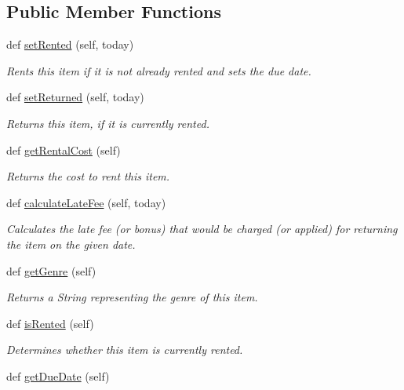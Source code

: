 \subsection*{Public Member Functions}
\begin{DoxyCompactItemize}
\item 
def \hyperlink{classItem_1_1Item_a866dd05fa3e3ab124f6afeaa171ab516}{set\+Rented} (self, today)
\begin{DoxyCompactList}\small\item\em Rents this item if it is not already rented and sets the due date. \end{DoxyCompactList}\item 
def \hyperlink{classItem_1_1Item_afc0dccd77c3d32664c5a424886d7d53c}{set\+Returned} (self, today)
\begin{DoxyCompactList}\small\item\em Returns this item, if it is currently rented. \end{DoxyCompactList}\item 
def \hyperlink{classItem_1_1Item_afe4448d1a099b956ecc0fc66ca22925d}{get\+Rental\+Cost} (self)
\begin{DoxyCompactList}\small\item\em Returns the cost to rent this item. \end{DoxyCompactList}\item 
def \hyperlink{classItem_1_1Item_a17d1bdd2d1f6d4ad81a9d1fd0b2d149d}{calculate\+Late\+Fee} (self, today)
\begin{DoxyCompactList}\small\item\em Calculates the late fee (or bonus) that would be charged (or applied) for returning the item on the given date. \end{DoxyCompactList}\item 
def \hyperlink{classItem_1_1Item_a4f815eee80b9dffbbc0be9d79a0520ff}{get\+Genre} (self)
\begin{DoxyCompactList}\small\item\em Returns a String representing the genre of this item. \end{DoxyCompactList}\item 
def \hyperlink{classItem_1_1Item_a2dcb80d5765c07aefe735cd657385764}{is\+Rented} (self)
\begin{DoxyCompactList}\small\item\em Determines whether this item is currently rented. \end{DoxyCompactList}\item 
def \hyperlink{classItem_1_1Item_a14c6c86e71412609102c9fb0cd009751}{get\+Due\+Date} (self)

\end{DoxyCompactItemize}
